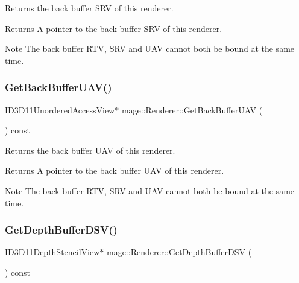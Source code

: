 Returns the back buffer S\+RV of this renderer.

\begin{DoxyReturn}{Returns}
A pointer to the back buffer S\+RV of this renderer. 
\end{DoxyReturn}
\begin{DoxyNote}{Note}
The back buffer R\+TV, S\+RV and U\+AV cannot both be bound at the same time. 
\end{DoxyNote}
\hypertarget{classmage_1_1_renderer_aa7e0a472b588985e3df51f1a528d08a7}{}\label{classmage_1_1_renderer_aa7e0a472b588985e3df51f1a528d08a7} 
\subsubsection{\texorpdfstring{Get\+Back\+Buffer\+U\+A\+V()}{GetBackBufferUAV()}}
{\footnotesize\ttfamily I\+D3\+D11\+Unordered\+Access\+View$\ast$ mage\+::\+Renderer\+::\+Get\+Back\+Buffer\+U\+AV (\begin{DoxyParamCaption}{ }\end{DoxyParamCaption}) const\hspace{0.3cm}{\ttfamily [noexcept]}}

Returns the back buffer U\+AV of this renderer.

\begin{DoxyReturn}{Returns}
A pointer to the back buffer U\+AV of this renderer. 
\end{DoxyReturn}
\begin{DoxyNote}{Note}
The back buffer R\+TV, S\+RV and U\+AV cannot both be bound at the same time. 
\end{DoxyNote}
\hypertarget{classmage_1_1_renderer_a0e292945b845c16cc4fa113ecb6d14c5}{}\label{classmage_1_1_renderer_a0e292945b845c16cc4fa113ecb6d14c5} 
\subsubsection{\texorpdfstring{Get\+Depth\+Buffer\+D\+S\+V()}{GetDepthBufferDSV()}}
{\footnotesize\ttfamily I\+D3\+D11\+Depth\+Stencil\+View$\ast$ mage\+::\+Renderer\+::\+Get\+Depth\+Buffer\+D\+SV (\begin{DoxyParamCaption}{ }\end{DoxyParamCaption}) const\hspace{0.3cm}{\ttfamily [noexcept]}}

